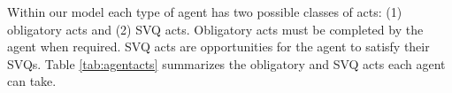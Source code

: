 \documentclass{scspaperproc}
\theoremstyle{scsthe}
\begin{document}

Within our model each type of agent has two possible classes of acts: (1) obligatory acts and (2) SVQ acts. Obligatory acts must be completed by the agent when required. SVQ acts are opportunities for the agent to satisfy their SVQs. Table \ref{tab:agentacts} summarizes the obligatory and SVQ acts each agent can take.
\end{document}
